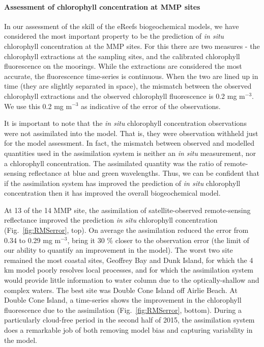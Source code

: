 \paragraph{Assessment of chlorophyll concentration at MMP sites}

In our assessment of the skill of the eReefs biogeochemical models, we have considered the most
important property to be the prediction of \textit{in situ} chlorophyll concentration at the MMP
sites. For this there are two measures - the chlorophyll extractions at the sampling sites, and the
calibrated chlorophyll fluorescence on the moorings.  While the extractions are considered the most
accurate, the fluorescence time-series is continuous. When the two are lined up in time (they are
slightly separated in space), the mismatch between the observed chlorophyll extractions and the
observed chlorophyll fluorescence is 0.2 mg m$^{-3}$. We use this 0.2 mg m$^{-3}$ as indicative of
the error of the observations.

It is important to note that the \textit{in situ} chlorophyll concentration observations were not
assimilated into the model. That is, they were observation withheld just for the model
assessment. In fact, the mismatch between observed and modelled quantities used in the assimilation
system is neither an \textit{in situ} measurement, nor a chlorophyll concentration. The assimilated
quantity was the ratio of remote-sensing reflectance at blue and green wavelengths. Thus, we can be
confident that if the assimilation system has improved the prediction of \textit{in situ}
chlorophyll concentration then it has improved the overall biogeochemical model.

At 13 of the 14 MMP site, the assimilation of satellite-observed remote-sensing reflectance improved
the prediction \textit{in situ} chlorophyll concentration (Fig.~\ref{fig:RMSerror}, top). On average
the assimilation reduced the error from 0.34 to 0.29 mg m$^{-3}$, bring it 30 \% closer to the
observation error (the limit of our ability to quantify an improvement in the model). The worst two
site remained the most coastal sites, Geoffrey Bay and Dunk Island, for which the 4 km model poorly
resolves local processes, and for which the assimilation system would provide little information to
water column due to the optically-shallow and complex waters. The best site was Double Cone Island
off Airlie Beach. At Double Cone Island, a time-series shows the improvement in the chlorophyll
fluorescence due to the assimilation (Fig.~\ref{fig:RMSerror}, bottom). During a particularly
cloud-free period in the second half of 2015, the assimilation system does a remarkable job of both
removing model bias and capturing variability in the model.



